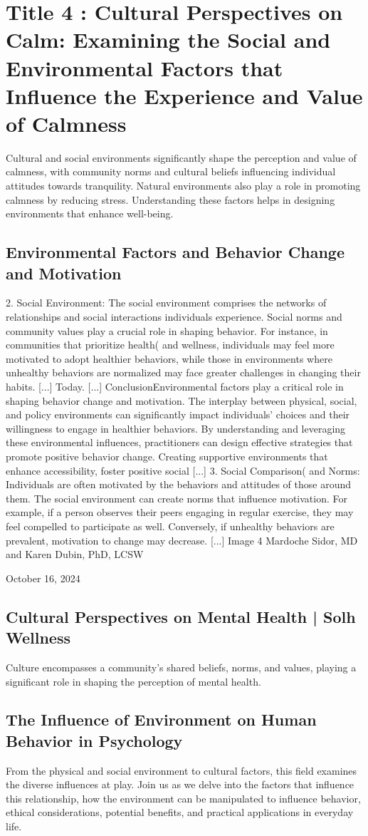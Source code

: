 \documentclass[12pt]{article}
\begin{document}
\section{Title 4 : Cultural Perspectives on Calm: Examining the Social and Environmental Factors that Influence the Experience and Value of Calmness}
Cultural and social environments significantly shape the perception and value of calmness, with community norms and cultural beliefs influencing individual attitudes towards tranquility. Natural environments also play a role in promoting calmness by reducing stress. Understanding these factors helps in designing environments that enhance well-being.\subsection{Environmental Factors and Behavior Change and Motivation}
2.   Social Environment: The social environment comprises the networks of relationships and social interactions individuals experience. Social norms and community values play a crucial role in shaping behavior. For instance, in communities that prioritize health( and wellness, individuals may feel more motivated to adopt healthier behaviors, while those in environments where unhealthy behaviors are normalized may face greater challenges in changing their habits. [...] Today. [...] ConclusionEnvironmental factors play a critical role in shaping behavior change and motivation. The interplay between physical, social, and policy environments can significantly impact individuals’ choices and their willingness to engage in healthier behaviors. By understanding and leveraging these environmental influences, practitioners can design effective strategies that promote positive behavior change. Creating supportive environments that enhance accessibility, foster positive social [...] 3.   Social Comparison( and Norms: Individuals are often motivated by the behaviors and attitudes of those around them. The social environment can create norms that influence motivation. For example, if a person observes their peers engaging in regular exercise, they may feel compelled to participate as well. Conversely, if unhealthy behaviors are prevalent, motivation to change may decrease. [...] Image 4 Mardoche Sidor, MD and Karen Dubin, PhD, LCSW

 October 16, 2024\subsection{Cultural Perspectives on Mental Health | Solh Wellness}
Culture encompasses a community's shared beliefs, norms, and values, playing a significant role in shaping the perception of mental health.\subsection{The Influence of Environment on Human Behavior in Psychology}
From the physical and social environment to cultural factors, this field examines the diverse influences at play. Join us as we delve into the factors that influence this relationship, how the environment can be manipulated to influence behavior, ethical considerations, potential benefits, and practical applications in everyday life.
\end{document}
